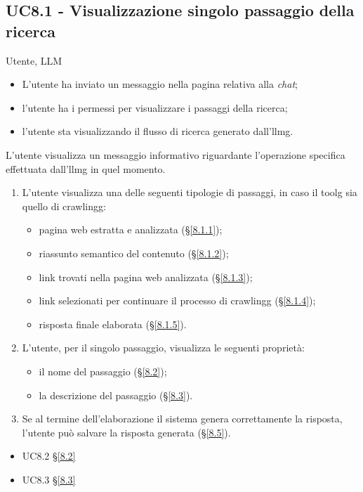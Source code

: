 \subsection{UC8.1 - Visualizzazione singolo passaggio della ricerca}
\label{8.1}
\makeUC{}
{Utente, LLM}
{   \begin{itemize}
        \item L'utente ha inviato un messaggio nella pagina relativa alla \textit{chat};
        \item l'utente ha i permessi per visualizzare i passaggi della ricerca;
        \item l'utente sta visualizzando il flusso di ricerca generato dall'\gls{llmg}.
    \end{itemize}
}
{L'utente visualizza un messaggio informativo riguardante l'operazione specifica effettuata dall'\gls{llmg} in quel momento.}
{
    \begin{enumerate}
        \item L'utente visualizza una delle seguenti tipologie di passaggi, in caso il \gls{toolg} sia quello di \gls{crawlingg}:
            \begin{itemize}
                \item pagina web estratta e analizzata (§\ref{8.1.1}); 
                \item riassunto semantico del contenuto (§\ref{8.1.2}); 
                \item link trovati nella pagina web analizzata (§\ref{8.1.3}); 
                \item link selezionati per continuare il processo di \gls{crawlingg} (§\ref{8.1.4}); 
                \item risposta finale elaborata (§\ref{8.1.5}). 
            \end{itemize}
        \item L'utente, per il singolo passaggio, visualizza le seguenti proprietà:
            \begin{itemize}
                \item il nome del passaggio (§\ref{8.2});
                \item la descrizione del passaggio (§\ref{8.3}).
            \end{itemize}
        \item Se al termine dell'elaborazione il sistema genera correttamente la risposta,
        l'utente può salvare la risposta generata (§\ref{8.5}).
    \end{enumerate}
}
{
    \begin{itemize}
        \item UC8.2 §\ref{8.2}
        \item UC8.3 §\ref{8.3}
    \end{itemize}
}
